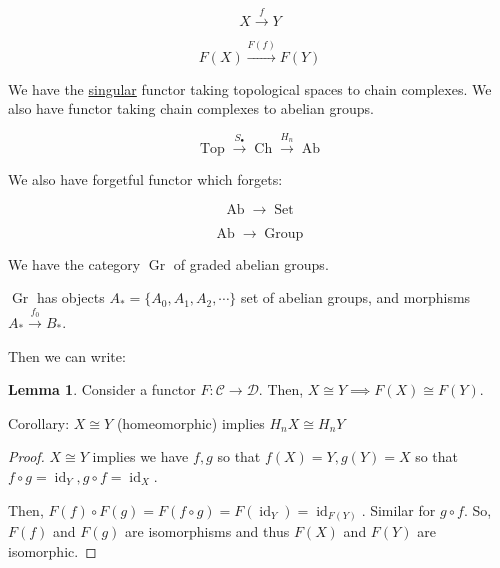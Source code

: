\documentclass{article}
\theoremstyle{definition}
\newtheorem{lemma}[theorem]{Lemma}
\begin{document}
    \[
        X \xrightarrow{f} Y
    \]

    \[
        F(X) \xrightarrow{F(f)} F(Y)
    \]

    We have the \underline{singular} functor taking topological spaces to chain complexes. We also have functor taking chain complexes to abelian groups.

    \[
        \operatorname{Top} \xrightarrow{S_\bullet} \operatorname{Ch} \xrightarrow{H_n} \operatorname{Ab} 
    \]

    We also have forgetful functor which forgets:

    \[
        \operatorname{Ab} \to \operatorname{Set} 
    \]

    \[
        \operatorname{Ab} \to \operatorname{Group} 
    \]

    We have the category \(\operatorname{Gr}\) of graded abelian groups.

    \(\operatorname{Gr}\) has objects \(A_{\ast} = \{ A_0, A_1, A_2, \cdots \} \) set of abelian groups, and morphisms \(A_{\ast} \xrightarrow{f_0} B_{\ast}\).
    
    Then we can write:

    \begin{center}
    \end{center}

    \begin{lemma}
        Consider a functor \(F: \mathcal{C} \to \mathcal{D}\). Then, \(X \cong Y \implies F(X) \cong F(Y)\).
    \end{lemma}

    Corollary: \(X \cong Y\) (homeomorphic) implies \(H_n X \cong H_n Y\) 

    \begin{proof}
        \(X\cong Y\) implies we have \(f,g\) so that \(f(X)=Y, g(Y) = X\) so that \(f \circ g = \operatorname{id}_{Y}, g \circ f = \operatorname{id}_{X}\).
        
        Then, \(F(f) \circ F(g) = F(f \circ g) = F(\operatorname{id}_{Y}) = \operatorname{id}_{F(Y)}\). Similar for \(g \circ f\). So, \(F(f)\) and \(F(g)\) are isomorphisms and thus \(F(X)\) and \(F(Y)\) are isomorphic. 
    \end{proof}
\end{document}
